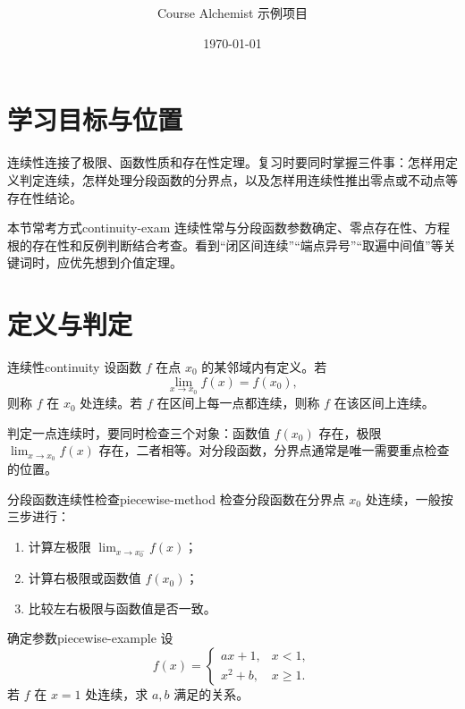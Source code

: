 \documentclass[UTF8,zihao=-4,scheme=chinese,fontset=windows]{ctexart}
\title{\bfseries \LectureTitle}
\author{Course Alchemist 示例项目}
\date{\today}
\begin{document}
\maketitle
\tableofcontents

\section{学习目标与位置}

连续性连接了极限、函数性质和存在性定理。复习时要同时掌握三件事：怎样用定义判定连续，怎样处理分段函数的分界点，以及怎样用连续性推出零点或不动点等存在性结论。

\begin{examspot}{本节常考方式}{continuity-exam}
连续性常与分段函数参数确定、零点存在性、方程根的存在性和反例判断结合考查。看到“闭区间连续”“端点异号”“取遍中间值”等关键词时，应优先想到介值定理。
\end{examspot}

\section{定义与判定}

\begin{definition}{连续性}{continuity}
设函数 $f$ 在点 $x_0$ 的某邻域内有定义。若
\[
  \lim_{x\to x_0} f(x)=f(x_0),
\]
则称 $f$ 在 $x_0$ 处连续。若 $f$ 在区间上每一点都连续，则称 $f$ 在该区间上连续。
\end{definition}

判定一点连续时，要同时检查三个对象：函数值 $f(x_0)$ 存在，极限 $\lim_{x\to x_0}f(x)$ 存在，二者相等。对分段函数，分界点通常是唯一需要重点检查的位置。

\begin{method}{分段函数连续性检查}{piecewise-method}
检查分段函数在分界点 $x_0$ 处连续，一般按三步进行：
\begin{enumerate}
  \item 计算左极限 $\lim_{x\to x_0^-}f(x)$；
  \item 计算右极限或函数值 $f(x_0)$；
  \item 比较左右极限与函数值是否一致。
\end{enumerate}
\end{method}

\begin{example}{确定参数}{piecewise-example}
设
\[
f(x)=
\begin{cases}
ax+1, & x<1,\\
x^2+b, & x\ge 1.
\end{cases}
\]
若 $f$ 在 $x=1$ 处连续，求 $a,b$ 满足的关系。
\end{example}
\end{document}
